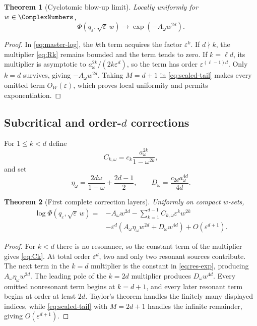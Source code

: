 \documentclass[11pt]{article}
\newtheorem{theorem}{Theorem}[section]
\theoremstyle{definition}
\newcommand{\eps}{\varepsilon}
\begin{document}
\begin{theorem}[Cyclotomic blow-up limit]
Locally uniformly for $w\in\ComplexNumbers$,
\begin{equation}
 \boxed{
 \Phi(q_\eps,\sqrt\eps\,w)
 \longrightarrow \exp(-A_\omega w^{2d}).}
 \label{eq:blowup-limit}
\end{equation}
\end{theorem}

\begin{proof}
In \cref{eq:master-log}, the $k$th term acquires the factor $\eps^k$.  If $d\nmid k$, the multiplier \cref{eq:Rk} remains bounded and the term tends to zero.  If $k=\ell d$, its multiplier is asymptotic to
\(
 a_\omega^{2k}/(2k\eps^d)
\), so the term has order $\eps^{(\ell-1)d}$.  Only $k=d$ survives, giving $-A_\omega w^{2d}$.  Taking $M=d+1$ in \cref{eq:scaled-tail} makes every omitted term $O_W(\eps)$, which proves local uniformity and permits exponentiation.
\end{proof}

\subsection{Subcritical and order-\texorpdfstring{$d$}{d} corrections}

For $1\le k<d$ define
\begin{equation}
 C_{k,\omega}
 =c_k\frac{a_\omega^{2k}}{1-\omega^{2k}},
 \label{eq:Ck}
\end{equation}
and set
\begin{equation}
 \eta_\omega=\frac{2d\omega}{1-\omega}+\frac{2d-1}{2},
 \qquad
 D_\omega=\frac{c_{2d}a_\omega^{4d}}{4d}.
 \label{eq:eta-D}
\end{equation}

\begin{theorem}[First complete correction layers]
Uniformly on compact $w$-sets,
\begin{align}
 \log\Phi(q_\eps,\sqrt\eps\,w)
 =&-A_\omega w^{2d}
 -\sum_{k=1}^{d-1}C_{k,\omega}\eps^kw^{2k}
 \label{eq:correction-1}\\
 &-\eps^d\left(
 A_\omega\eta_\omega w^{2d}
 +D_\omega w^{4d}
 \right)
 +O(\eps^{d+1}).
 \label{eq:correction-2}
\end{align}
\end{theorem}

\begin{proof}
For $k<d$ there is no resonance, so the constant term of the multiplier gives \cref{eq:Ck}.  At total order $\eps^d$, two and only two resonant sources contribute.  The next term in the $k=d$ multiplier is the constant in \cref{eq:res-exp}, producing $A_\omega\eta_\omega w^{2d}$.  The leading pole of the $k=2d$ multiplier produces $D_\omega w^{4d}$.  Every omitted nonresonant term begins at $k=d+1$, and every later resonant term begins at order at least $2d$.  Taylor's theorem handles the finitely many displayed indices, while \cref{eq:scaled-tail} with $M=2d+1$ handles the infinite remainder, giving $O(\eps^{d+1})$.
\end{proof}
\end{document}
